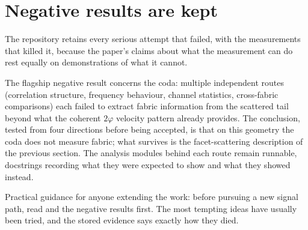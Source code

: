 \section{Negative results are kept}

The repository retains every serious attempt that failed, with the
measurements that killed it, because the paper's claims about what
the measurement can do rest equally on demonstrations of what it
cannot.

The flagship negative result concerns the coda: multiple independent
routes (correlation structure, frequency behaviour, channel
statistics, cross-fabric comparisons) each failed to extract fabric
information from the scattered tail beyond what the coherent
$2\varphi$ velocity pattern already provides. The conclusion, tested
from four directions before being accepted, is that on this
geometry the coda does not measure fabric; what survives is the
facet-scattering description of the previous section. The analysis
modules behind each route remain runnable, docstrings recording what
they were expected to show and what they showed instead.

Practical guidance for anyone extending the work: before pursuing a
new signal path, read  and the negative
results first. The most tempting ideas have usually been tried, and
the stored evidence says exactly how they died.

